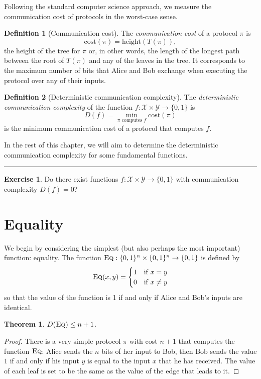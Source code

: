 \documentclass[11pt,oneside]{book}
\theoremstyle{plain}
\newtheorem{theorem}{Theorem}
\theoremstyle{definition}
\newtheorem{definition}{Definition}
\newtheorem{exercise}{Exercise}
\theoremstyle{plain}
\newcommand{\cost}{\mathrm{cost}}
\newcommand{\Eq}{\textsc{Eq}}
\newcommand{\exercises}{\bigskip \noindent\rule{8cm}{0.4pt} \medskip}
\begin{document}
Following the standard computer science approach, we measure the communication cost of protocols in the worst-case sense.

\begin{definition}[Communication cost]
	The \emph{communication cost} of a protocol $\pi$ is 
	\[
	\cost(\pi) = \mathrm{height}(T(\pi)),
	\]
	the height of the tree for $\pi$ or, in other words, the length of the longest path between the root of $T(\pi)$ and any of the leaves in the tree.
	It corresponds to the maximum number of bits that Alice and Bob exchange when executing the protocol over any of their inputs.
\end{definition}


\begin{definition}[Deterministic communication complexity]
	The \emph{deterministic communication complexity} of the function $f : \mathcal{X} \times \mathcal{Y} \to \{0,1\}$ is
	\[
	D(f) = \min_{\pi \mbox{ computes } f} \cost(\pi)
	\]
	is the minimum communication cost of a protocol that computes $f$.
\end{definition}

In the rest of this chapter, we will aim to determine the deterministic communication complexity for some fundamental functions.

\exercises

\begin{exercise} %
	Do there exist functions $f : \mathcal{X} \times \mathcal{Y} \to \{0,1\}$ with  communication complexity $D(f) = 0$?
\end{exercise}


\section{Equality}
We begin by considering the simplest (but also perhaps the most important) function: equality. The function $\Eq : \{0,1\}^n \times \{0,1\}^n \to \{0,1\}$ is defined by
\[
\Eq(x,y) = \begin{cases}
1 & \mbox{if } x = y \\
0 & \mbox{if } x \neq y
\end{cases}
\]
so that the value of the function is 1 if and only if Alice and Bob's inputs are identical.

\begin{theorem}
	$D(\Eq) \le n + 1$.
\end{theorem}

\begin{proof}
	There is a very simple protocol $\pi$ with cost $n+1$ that computes the function $\Eq$: Alice sends the $n$ bits of her input to Bob, then Bob sends the value $1$ if and only if his input $y$ is equal to the input $x$ that he has received. The value of each leaf is set to be the same as the value of the edge that leads to it.
\end{proof}
\end{document}
